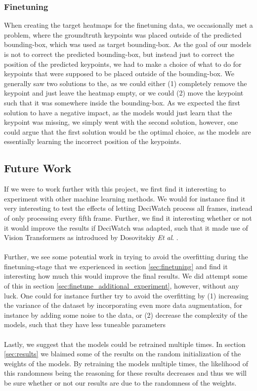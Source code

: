 \documentclass[./main.tex]{subfiles}
\begin{document}
\subsubsection{Finetuning}
When creating the target heatmaps for the finetuning data, we occasionally met a problem, where the groundtruth keypoints was placed outside of the predicted bounding-box, which was used as target bounding-box. As the goal of our models is not to correct the predicted bounding-box, but instead just to correct the position of the predicted keypoints, we had to make a choice of what to do for keypoints that were supposed to be placed outside of the bounding-box. We generally saw two solutions to the, as we could either (1) completely remove the keypoint and just leave the heatmap empty, or we could (2) move the keypoint such that it was somewhere inside the bounding-box. As we expected the first solution to have a negative impact, as the models would just learn that the keypoint was missing, we simply went with the second solution, however, one could argue that the first solution would be the optimal choice, as the models are essentially learning the incorrect position of the keypoints.


\subsection{Future Work}
\label{sec:future_work}
If we were to work further with this project, we first find it interesting to experiment with other machine learning methods. We would for instance find it very interesting to test the effects of letting DeciWatch process all frames, instead of only processing every fifth frame. Further, we find it interesting whether or not it would improve the results if DeciWatch was adapted, such that it made use of Vision Transformers as introduced by Dosovitskiy \textit{Et al}. \cite{dosovitskiy2021image}.
\\
\\
Further, we see some potential work in trying to avoid the overfitting during the finetuning-stage that we experienced in section \ref{sec:finetuning} and find it interesting how much this would improve the final results. We did attempt some of this in section \ref{sec:finetune_additional_experiment}, however, without any luck. One could for instance further try to avoid the overfitting by (1) increasing the variance of the dataset by incorporating even more data augmentation, for instance by adding some noise to the data, or (2) decrease the complexity of the models, such that they have less tuneable parameters
\\
\\
Lastly, we suggest that the models could be retrained multiple times. In section \ref{sec:results} we blaimed some of the results on the random initialization of the weights of the models. By retraining the models multiple times, the likelihood of this randomness being the reasoning for these results decreases and thus we will be sure whether or not our results are due to the randomness of the weights.
\end{document}
